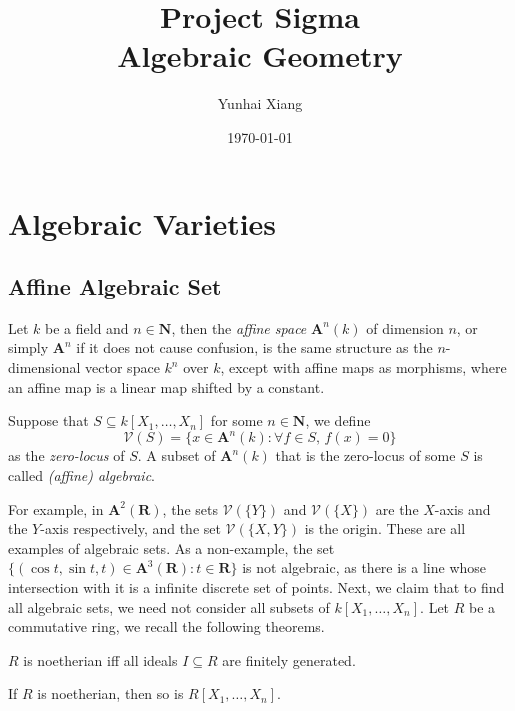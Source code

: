 \documentclass[11pt]{book}
\title{
\vspace{-2.0cm}
\Large{Project Sigma}\\
\vspace{1cm}
\huge{\bf{Algebraic Geometry}}
\vspace{3cm}}
\author{Yunhai Xiang}
\date{\today}
\begin{document}
\maketitle
\doublespacing
\tableofcontents
\singlespacing
\newpage
\chapter{Algebraic Varieties}
\section{Affine Algebraic Set}
Let $k$ be a field and $n\in\mathbf N$, then the \textit{affine space} $\mathbf A^n(k)$ of dimension $n$, or simply $\mathbf A^n$ if it does not cause confusion, is the same structure as the $n$-dimensional vector space $k^n$ over $k$, except with affine maps as morphisms, where an affine map is a linear map shifted by a constant. 

\begin{definition}
Suppose that $S\subseteq k[X_1,\dots,X_n]$ for some $n\in\mathbf N$, we define
\[\mathcal{V}(S)=\{x\in \mathbf A^n(k):\forall f\in S,\,f(x)=0\}\]
as the \textit{zero-locus} of $S$. A subset of $\mathbf A^n(k)$ that is the zero-locus of some $S$ is called \textit{(affine) algebraic}.
\end{definition}
For example, in $\mathbf{A}^2(\mathbf R)$, the sets $\mathcal{V}(\{Y\})$ and $\mathcal{V}(\{X\})$ are the $X$-axis and the $Y$-axis respectively, and the set $\mathcal{V}(\{X,Y\})$ is the origin. These are all examples of algebraic sets. As a non-example, the set $\{(\cos t,\sin t,t)\in\mathbf A^3(\mathbf R):t\in\mathbf R\}$ is not algebraic, as there is a line whose intersection with it is a infinite discrete set of points. Next, we claim that to find all algebraic sets, we need not consider all subsets of $k[X_1,\dots,X_n]$. Let $R$ be a commutative ring, we recall the following theorems.
\begin{theorem}$R$ is noetherian iff all ideals $I\subseteq R$ are finitely generated.
\end{theorem}
\begin{theorem}If $R$ is noetherian, then so is $R[X_1,\dots,X_n]$.
\end{theorem}
\end{document}
